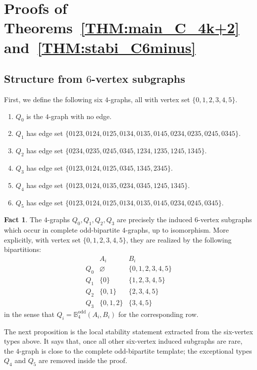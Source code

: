 \documentclass[10pt,a4paper]{article}
\theoremstyle{plain}
\theoremstyle{definition}
\newtheorem{fact}[fact]{Fact}
\begin{document}
\section{Proofs of Theorems~\ref{THM:main_C_4k+2} and~\ref{THM:stabi_C6minus}}\label{SEC:stability}

\subsection{Structure from \texorpdfstring{$6$}{6}-vertex subgraphs}


First, we define the following six $4$-graphs, all with vertex set $\{0,1,2,3,4,5\}$.
\begin{enumerate}[label=\textup{(\roman*)}]
\item $Q_0$ is the $4$-graph with no edge.
\item $Q_1$ has edge set $\{0123,0124,0125,0134,0135,0145,0234,0235,0245,0345\}$. 
\item $Q_2$ has edge set $\{0234,0235,0245,0345,1234,1235,1245,1345\}$. 
\item $Q_3$ has edge set $\{0123,0124,0125,0345,1345,2345\}$. 
\item $Q_4$ has edge set $\{0123,0124,0135,0234,0345,1245,1345\}$. 
\item $Q_5$ has edge set $\{0123,0124,0125,0134,0135,0145,0234,0245,0345\}$. 
\end{enumerate}

\begin{fact}\label{FACT:six-vertex-odd-bipartite-types}
The $4$-graphs $Q_0,Q_1,Q_2,Q_3$ are precisely the induced $6$-vertex subgraphs which occur in complete odd-bipartite $4$-graphs, up to isomorphism.
More explicitly, with vertex set $\{0,1,2,3,4,5\}$, they are realized by the following bipartitions:
\[
\begin{array}{c|c|c}
& A_i & B_i\\
\hline
Q_0 & \varnothing & \{0,1,2,3,4,5\}\\
Q_1 & \{0\} & \{1,2,3,4,5\}\\
Q_2 & \{0,1\} & \{2,3,4,5\}\\
Q_3 & \{0,1,2\} & \{3,4,5\}
\end{array}
\]
in the sense that $Q_i=\mathbb{B}_4^{\mathrm{odd}}(A_i,B_i)$ for the corresponding row.
\end{fact}


The next proposition is the local stability statement extracted from the six-vertex types above.
It says that, once all other six-vertex induced subgraphs are rare, the $4$-graph is close to the complete odd-bipartite template; the exceptional types $Q_4$ and $Q_5$ are removed inside the proof.
\end{document}
